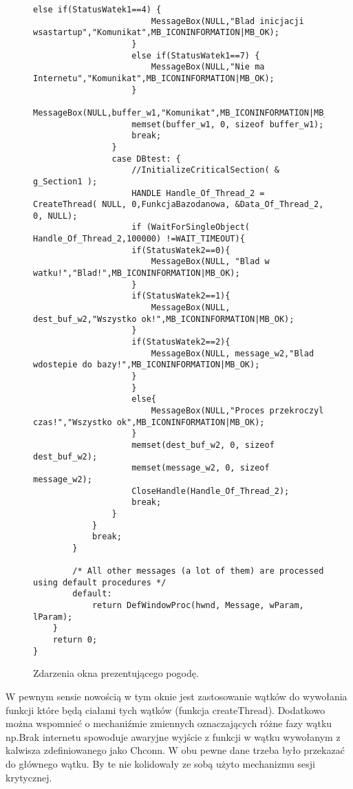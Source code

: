 \documentclass[a4paper,twoside,12pt]{mgr}
\begin{document}
\begin{figure}[H]
\centering
\begin{lstlisting}[frame=single]
				else if(StatusWatek1==4) {
						MessageBox(NULL,"Blad inicjacji wsastartup","Komunikat",MB_ICONINFORMATION|MB_OK);
					}
					else if(StatusWatek1==7) {
						MessageBox(NULL,"Nie ma Internetu","Komunikat",MB_ICONINFORMATION|MB_OK);
					}
					MessageBox(NULL,buffer_w1,"Komunikat",MB_ICONINFORMATION|MB_OK);
					memset(buffer_w1, 0, sizeof buffer_w1);
					break;
				}
				case DBtest: {
					//InitializeCriticalSection( & g_Section1 );
					HANDLE Handle_Of_Thread_2 = CreateThread( NULL, 0,FunkcjaBazodanowa, &Data_Of_Thread_2, 0, NULL);
					if (WaitForSingleObject( Handle_Of_Thread_2,100000) !=WAIT_TIMEOUT){
					if(StatusWatek2==0){
						MessageBox(NULL, "Blad w watku!","Blad!",MB_ICONINFORMATION|MB_OK);
					}
					if(StatusWatek2==1){
						MessageBox(NULL, dest_buf_w2,"Wszystko ok!",MB_ICONINFORMATION|MB_OK);
					}
					if(StatusWatek2==2){
						MessageBox(NULL, message_w2,"Blad wdostepie do bazy!",MB_ICONINFORMATION|MB_OK);
					}
					}
        			else{
    					MessageBox(NULL,"Proces przekroczyl czas!","Wszystko ok",MB_ICONINFORMATION|MB_OK);
					}
					memset(dest_buf_w2, 0, sizeof dest_buf_w2);
					memset(message_w2, 0, sizeof message_w2);
					CloseHandle(Handle_Of_Thread_2);
					break;
				}
			}
			break;
		}
		
		/* All other messages (a lot of them) are processed using default procedures */
		default:
			return DefWindowProc(hwnd, Message, wParam, lParam);
	}
	return 0;
}
\end{lstlisting}
\caption{Zdarzenia okna prezentującego pogodę.}%
\label{rys:etykieta}
\end{figure}
W pewnym sensie nowością w tym oknie jest zastosowanie wątków do wywołania funkcji które będą ciałami tych wątków (funkcja createThread). Dodatkowo można wspomnieć o mechaniźmie zmiennych oznaczających różne fazy wątku np.Brak internetu spowoduje awaryjne wyjście z funkcji w wątku wywołanym z kalwisza zdefiniowanego jako Chconn. W obu pewne dane trzeba było przekazać do głównego wątku. By te nie kolidowały ze sobą użyto mechanizmu sesji krytycznej.
\end{document}
